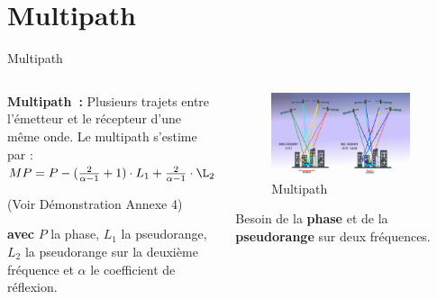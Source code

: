\documentclass[xcolor=dvipsnames,envcountsect]{beamer}
\begin{document}
\section{Multipath}
\begin{frame}{Multipath}
	\begin{columns}
		\begin{column}{0.5\textwidth}
			\textbf{Multipath :} 
			Plusieurs trajets entre l'émetteur et le récepteur d'une même onde.
			\newline
			\newline
			Le multipath s'estime par : $MP = P - (\frac{2}{\alpha - 1} + 1) \cdot L_1 + \frac{2}{\alpha - 1} \cdot \L_2$
			\begin{flushright}
				\tiny{(Voir Démonstration Annexe 4)}
			\end{flushright}
			{\small \textbf{avec} $P$ la phase, $L_1$ la pseudorange, $L_2$ la pseudorange sur la deuxième fréquence et $\alpha$ le coefficient de réflexion.}
		\end{column}
		\begin{column}{0.5\textwidth}
			\begin{figure}
				\centering
				\includegraphics[width=0.9\textwidth]{./Figures/multipath2.png}
				\caption {Multipath \cite{esa}}	
			\end{figure}
			Besoin de la \textbf{phase} et de la \textbf{pseudorange} sur deux fréquences.
		\end{column}	
	\end{columns}
\end{frame}
\end{document}
